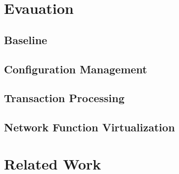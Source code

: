 \documentclass[twocolumn]{article}
\begin{document}
\section{Evauation}

\subsection{Baseline}

\subsection{Configuration Management}

\subsection{Transaction Processing}

\subsection{Network Function Virtualization}

\section{Related Work}
\end{document}
